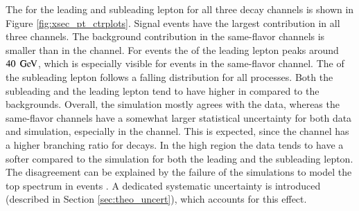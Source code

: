 The \pt for the leading and subleading lepton for all three decay channels is shown in Figure \ref{fig:xsec_pt_ctrplots}.
Signal events have the largest contribution in all three channels. The background contribution in the same-flavor channels is smaller than in the \emu channel. 
For \ttbar events the \pt of the leading lepton peaks around $40\; \,\text{Ge\hspace{-.08em}V}$, which is especially visible for events in the same-flavor channel. The \pt of the subleading lepton follows a falling distribution for all processes. 
Both the subleading and the leading lepton tend to have higher \pt in \ttbar compared to the backgrounds.
Overall, the simulation mostly agrees with the data, whereas the same-flavor channels have a somewhat larger statistical uncertainty for both data and simulation, especially in the \ee channel.
This is expected, since the \emu channel has a higher branching ratio for \ttbar decays.
In the high \pt region the data tends to have a softer \pt compared to the simulation for both the leading and the subleading lepton.
The disagreement can be explained by the failure of the simulations to model the top \pt spectrum in \ttbar events \cite{Khachatryan:2015oqa,Aad:2015mbv}. A dedicated systematic uncertainty is introduced (described in Section \ref{sec:theo_uncert}), which accounts for this effect.


